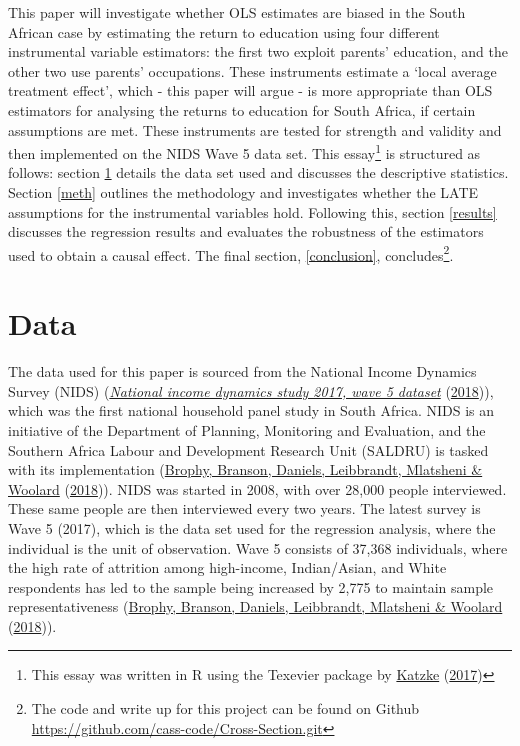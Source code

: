 \documentclass[11pt,preprint, authoryear]{elsarticle}
\numberwithin{equation}{section}
\numberwithin{figure}{section}
\numberwithin{table}{section}
\let\rmarkdownfootnote\footnote%
\def\footnote{\protect\rmarkdownfootnote}
\begin{document}
This paper will investigate whether OLS estimates are biased in the
South African case by estimating the return to education using four
different instrumental variable estimators: the first two exploit
parents' education, and the other two use parents' occupations. These
instruments estimate a `local average treatment effect', which - this
paper will argue - is more appropriate than OLS estimators for analysing
the returns to education for South Africa, if certain assumptions are
met. These instruments are tested for strength and validity and then
implemented on the NIDS Wave 5 data set. This essay\footnote{This essay
  was written in R using the Texevier package by
  \protect\hyperlink{ref-Texevier}{Katzke}
  (\protect\hyperlink{ref-Texevier}{2017})} is structured as follows:
section \ref{data} details the data set used and discusses the
descriptive statistics. Section \ref{meth} outlines the methodology and
investigates whether the LATE assumptions for the instrumental variables
hold. Following this, section \ref{results} discusses the regression
results and evaluates the robustness of the estimators used to obtain a
causal effect. The final section, \ref{conclusion},
concludes\footnote{The code and write up for this project can be found
  on Github \url{https://github.com/cass-code/Cross-Section.git}}.

\hypertarget{data}{%
\section{\texorpdfstring{Data \label{data}}{Data }}\label{data}}

The data used for this paper is sourced from the National Income
Dynamics Survey (NIDS) (\protect\hyperlink{ref-nids}{\emph{National
income dynamics study 2017, wave 5 dataset}}
(\protect\hyperlink{ref-nids}{2018})), which was the first national
household panel study in South Africa. NIDS is an initiative of the
Department of Planning, Monitoring and Evaluation, and the Southern
Africa Labour and Development Research Unit (SALDRU) is tasked with its
implementation (\protect\hyperlink{ref-nids5}{Brophy, Branson, Daniels,
Leibbrandt, Mlatsheni \& Woolard}
(\protect\hyperlink{ref-nids5}{2018})). NIDS was started in 2008, with
over 28,000 people interviewed. These same people are then interviewed
every two years. The latest survey is Wave 5 (2017), which is the data
set used for the regression analysis, where the individual is the unit
of observation. Wave 5 consists of 37,368 individuals, where the high
rate of attrition among high-income, Indian/Asian, and White respondents
has led to the sample being increased by 2,775 to maintain sample
representativeness (\protect\hyperlink{ref-nids5}{Brophy, Branson,
Daniels, Leibbrandt, Mlatsheni \& Woolard}
(\protect\hyperlink{ref-nids5}{2018})).
\end{document}
